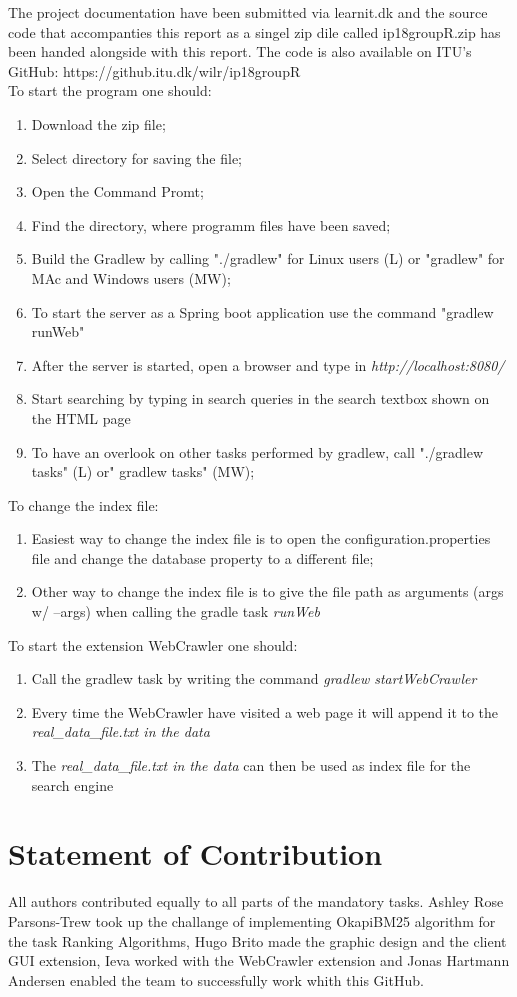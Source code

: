 The project documentation have been submitted via learnit.dk and the source code that accompanties this report as a singel zip dile called ip18groupR.zip has been handed alongside with this report.
The code is also available on ITU's GitHub: https://github.itu.dk/wilr/ip18groupR\\
To start the program one should:
\begin{enumerate}
    \item  Download the zip file;
    \item  Select directory for saving the file;
    \item  Open the Command Promt;
    \item  Find the directory, where programm files have been saved;
    \item  Build the Gradlew by calling "./gradlew" for Linux users (L) or "gradlew" for MAc and Windows users (MW);
    \item  To start the server as a  Spring boot application use the command "gradlew runWeb"
    \item After the server is started, open a browser and type in \textit{http://localhost:8080/}
    \item Start searching by typing in search queries in the search textbox shown on the HTML page
    \item To have an overlook on other tasks performed by gradlew, call "./gradlew tasks" (L) or" gradlew tasks" (MW);
\end{enumerate}

To change the index file:
\begin{enumerate}
    \item Easiest way to change the index file is to open the configuration.properties file and change the database property to a different file;
    \item Other way to change the index file is to give the file path as arguments (args w/ --args) when calling the gradle task \textit{runWeb}
\end{enumerate}

To start the extension WebCrawler one should:
\begin{enumerate}
    \item Call the gradlew task by writing the command  \textit{gradlew startWebCrawler}
    \item Every time the WebCrawler have visited a web page it will append it to the \textit{real\_data\_file.txt in the data}
    \item The \textit{real\_data\_file.txt in the data} can then be used as index file for the search engine
\end{enumerate}

\section{Statement of Contribution}
\label{sec:Statement of Contribution}
All authors contributed equally to all parts of the mandatory tasks. Ashley Rose Parsons-Trew took up the challange of implementing OkapiBM25 algorithm for the task Ranking Algorithms, Hugo Brito made the graphic design and the client GUI extension, Ieva worked with the WebCrawler extension and Jonas Hartmann Andersen enabled the team to successfully work whith this GitHub.